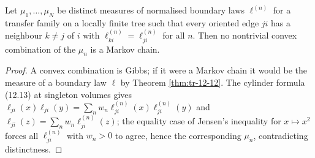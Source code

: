\begin{corollary}[Georgii (12.18)]
    \label{cor:tr-12-18}
    \leanok

    Let $\mu_1, \dots, \mu_N$ be distinct measures of normalised boundary laws $\ell^{(n)}$ for
    a transfer family on a locally finite tree such that every oriented edge $ji$ has a neighbour
    $k \neq j$ of $i$ with $\ell^{(n)}_{ki} = \ell^{(n)}_{ji}$ for all $n$. Then no nontrivial
    convex combination of the $\mu_n$ is a Markov chain.
\end{corollary}
\begin{proof}
    \leanok
    A convex combination is Gibbs; if it were a Markov chain it would be the measure of a
    boundary law $\ell$ by Theorem \ref{thm:tr-12-12}. The cylinder formula (12.13) at
    singleton volumes gives $\ell_{ji}(x)\ell_{ji}(y) = \sum_n w_n \ell^{(n)}_{ji}(x)\ell^{(n)}_{ji}(y)$
    and $\ell_{ji}(z) = \sum_n w_n \ell^{(n)}_{ji}(z)$; the equality case of Jensen's inequality
    for $x \mapsto x^2$ forces all $\ell^{(n)}_{ji}$ with $w_n > 0$ to agree, hence the
    corresponding $\mu_n$, contradicting distinctness.
\end{proof}
